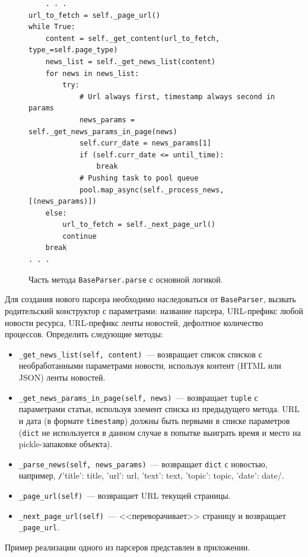 \documentclass[a4paper, 14pt]{extarticle}
\begin{document}
\begin{figure}
	\centering
	\begin{verbatim}
	. . .
url_to_fetch = self._page_url()
while True:
    content = self._get_content(url_to_fetch, type_=self.page_type)
    news_list = self._get_news_list(content)
    for news in news_list:
        try:
            # Url always first, timestamp always second in params
            news_params = self._get_news_params_in_page(news)
            self.curr_date = news_params[1]
            if (self.curr_date <= until_time):
                break
            # Pushing task to pool queue
            pool.map_async(self._process_news, [(news_params)])
    else:
        url_to_fetch = self._next_page_url()
        continue
    break
. . .
	\end{verbatim}
	\caption{Часть метода \texttt{BaseParser.parse} с основной логикой.}
	\label{parse}
\end{figure}



Для создания нового парсера необходимо наследоваться от \texttt{BaseParser}, вызвать родительский конструктор с параметрами: название парсера, URL-префикс любой новости ресурса, URL-префикс ленты новостей, дефолтное количество процессов. Определить следующие методы:
\begin{itemize}
	\item \texttt{\_get\_news\_list(self, content)}~--- возвращает список списков с необработанными параметрами новости, используя контент (HTML или JSON) ленты новостей.
	\item \texttt{\_get\_news\_params\_in\_page(self, news)}~--- возвращает \texttt{tuple} с параметрами статьи, используя элемент списка из предыдущего метода. URL и дата (в формате \texttt{timestamp}) должны быть первыми в списке параметров (\texttt{dict} не используется в данном случае в попытке выиграть время и место на pickle-запаковке объекта).
	\item \texttt{\_parse\_news(self, news\_params)}~--- возвращает \texttt{dict} с новостью, например, \texttt/{'title': title, 'url': url, 'text': text, 'topic': topic, 'date': date}/.
	\item \texttt{\_page\_url(self)}~--- возвращает URL текущей страницы.
	\item \texttt{\_next\_page\_url(self)}~--- <<переворачивает>> страницу и возвращает \texttt{\_page\_url}.
\end{itemize}

Пример реализации одного из парсеров представлен в приложении.
\end{document}
